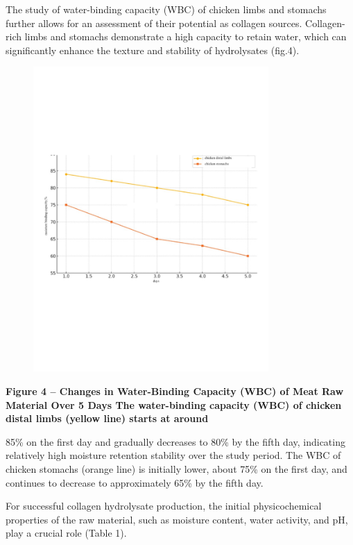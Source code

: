 The study of water-binding capacity (WBC) of chicken limbs and stomachs
further allows for an assessment of their potential as collagen sources.
Collagen-rich limbs and stomachs demonstrate a high capacity to retain
water, which can significantly enhance the texture and stability of
hydrolysates (fig.4).

\begin{figure}[H]
	\centering
	\includegraphics[width=0.8\textwidth]{media/pish/image12}
	\caption*{}
\end{figure}


{\bfseries Figure 4 -- Changes in Water-Binding Capacity (WBC) of Meat Raw
Material Over 5 Days The water-binding capacity (WBC) of chicken distal
limbs (yellow line) starts at around}

85\% on the first day and gradually decreases to 80\% by the fifth day,
indicating relatively high moisture retention stability over the study
period. The WBC of chicken stomachs (orange line) is initially lower,
about 75\% on the first day, and continues to decrease to approximately
65\% by the fifth day.

For successful collagen hydrolysate production, the initial
physicochemical properties of the raw material, such as moisture
content, water activity, and pH, play a crucial role (Table 1).


